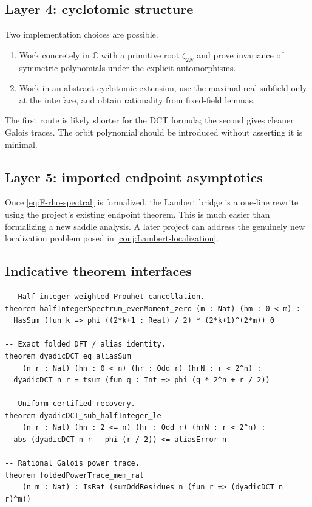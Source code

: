 \documentclass[11pt,oneside]{article}
\theoremstyle{definition}
\theoremstyle{remark}
\newcommand{\C}{\mathbb C}
\begin{document}
\subsection{Layer 4: cyclotomic structure}

Two implementation choices are possible.
\begin{enumerate}
 \item Work concretely in $\C$ with a primitive root $\zeta_{2N}$ and prove
 invariance of symmetric polynomials under the explicit automorphisms.
 \item Work in an abstract cyclotomic extension, use the maximal real subfield
 only at the interface, and obtain rationality from fixed-field lemmas.
\end{enumerate}
The first route is likely shorter for the DCT formula; the second gives cleaner
Galois traces.  The orbit polynomial should be introduced without asserting it
is minimal.

\subsection{Layer 5: imported endpoint asymptotics}

Once \eqref{eq:F-rho-spectral} is formalized, the Lambert bridge is a one-line
rewrite using the project's existing endpoint theorem.  This is much easier than
formalizing a new saddle analysis.  A later project can address the genuinely
new localization problem posed in \cref{conj:Lambert-localization}.

\subsection{Indicative theorem interfaces}

\begin{lstlisting}[style=pseudo,caption={Schematic Lean theorem signatures.}]
-- Half-integer weighted Prouhet cancellation.
theorem halfIntegerSpectrum_evenMoment_zero (m : Nat) (hm : 0 < m) :
  HasSum (fun k => phi ((2*k+1 : Real) / 2) * (2*k+1)^(2*m)) 0

-- Exact folded DFT / alias identity.
theorem dyadicDCT_eq_aliasSum
    (n r : Nat) (hn : 0 < n) (hr : Odd r) (hrN : r < 2^n) :
  dyadicDCT n r = tsum (fun q : Int => phi (q * 2^n + r / 2))

-- Uniform certified recovery.
theorem dyadicDCT_sub_halfInteger_le
    (n r : Nat) (hn : 2 <= n) (hr : Odd r) (hrN : r < 2^n) :
  abs (dyadicDCT n r - phi (r / 2)) <= aliasError n

-- Rational Galois power trace.
theorem foldedPowerTrace_mem_rat
    (n m : Nat) : IsRat (sumOddResidues n (fun r => (dyadicDCT n r)^m))
\end{lstlisting}
\end{document}
